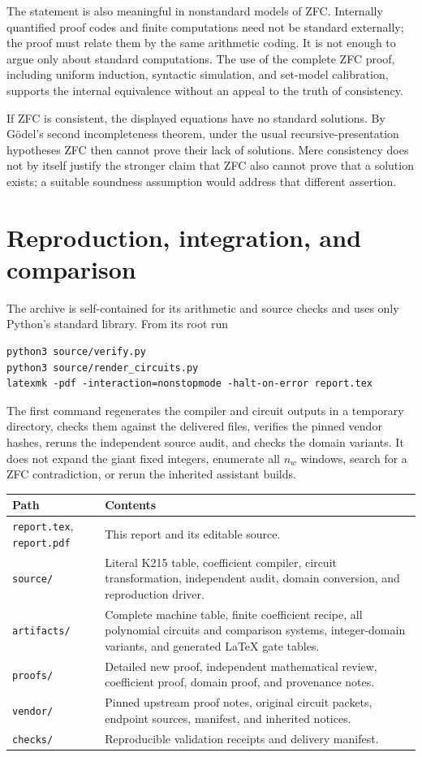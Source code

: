 \documentclass[11pt,a4paper]{article}
\theoremstyle{remark}
\newcommand{\code}[1]{\nolinkurl{#1}}
\begin{document}
The statement is also meaningful in nonstandard models of ZFC. Internally
quantified proof codes and finite computations need not be standard
externally; the proof must relate them by the same arithmetic coding.
It is not enough to argue only about standard computations. The use
of the complete ZFC proof, including uniform induction, syntactic
simulation, and set-model calibration, supports the internal equivalence
without an appeal to the truth of consistency.

If ZFC is consistent, the displayed equations have no standard
solutions. By G\"odel's second incompleteness theorem, under the usual
recursive-presentation hypotheses ZFC then cannot prove their lack of
solutions. Mere consistency does not by itself justify the stronger
claim that ZFC also cannot prove that a solution exists; a suitable
soundness assumption would address that different assertion.

\section{Reproduction, integration, and comparison}
\label{sec:reproduce}

The archive is self-contained for its arithmetic and source checks and
uses only Python's standard library. From its root run
\begin{verbatim}
python3 source/verify.py
python3 source/render_circuits.py
latexmk -pdf -interaction=nonstopmode -halt-on-error report.tex
\end{verbatim}
The first command regenerates the compiler and circuit outputs in a
temporary directory, checks them against the delivered files, verifies
the pinned vendor hashes, reruns the independent source audit, and
checks the domain variants. It does not expand the giant fixed
integers, enumerate all $n_w$ windows, search for a ZFC contradiction,
or rerun the inherited assistant builds.

\begin{center}\small
\begin{tabular}{p{}p{}}
\toprule
Path & Contents\\
\midrule
\code{report.tex}, \code{report.pdf} & This report and its editable source.\\
\code{source/} & Literal K215 table, coefficient compiler, circuit transformation,
independent audit, domain conversion, and reproduction driver.\\
\code{artifacts/} & Complete machine table, finite coefficient recipe,
all polynomial circuits and comparison systems, integer-domain variants,
and generated LaTeX gate tables.\\
\code{proofs/} & Detailed new proof, independent mathematical review,
coefficient proof, domain proof, and provenance notes.\\
\code{vendor/} & Pinned upstream proof notes, original circuit packets,
endpoint sources, manifest, and inherited notices.\\
\code{checks/} & Reproducible validation receipts and delivery manifest.\\
\bottomrule
\end{tabular}
\end{center}
\end{document}
